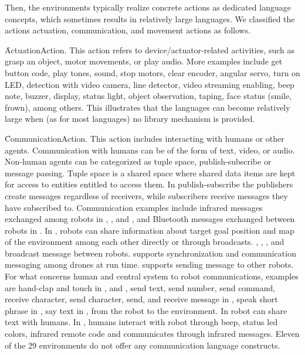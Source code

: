 Then, the environments typically realize concrete actions as dedicated language concepts, which sometimes results in relatively large languages. We classified the actions actuation, communication, and movement actions as follows.

\f{ActuationAction}. This action refers to device/actuator-related activities, such as grasp an object, motor movements, or play audio. More examples include get button code, play tones, sound, stop motors, clear encoder, angular servo, turn on LED, detection with video camera, line detector, video streaming enabling, beep note, buzzer, display, status light, object observation, taping, face status (smile, frown), among others. This illustrates that the languages can become relatively large when (as for most languages) no library mechanism is provided. %

\f{CommunicationAction}. This action includes interacting with humans or other agents. Communication with humans can be of the form of text, video, or audio. Non-human agents can be categorized as tuple space, publish-subscribe or message passing. Tuple space is a shared space where shared data items are kept for access to entities entitled to access them. In publish-subscribe the publishers create messages regardless of receivers, while subscribers receive messages they have subscribed to.
%
Communication examples include infrared messages exchanged among robots in \edison, \lego, and \openroberta, and Bluetooth messages exchanged between robots in \lego. In \missionlab, robots can share information about target goal position and map of the environment among each other directly or through broadcasts. \sphero, \vex, \makeblock, and \tello broadcast message between robots. \flyaq supports synchronization and communication messaging among drones at run time.  \trik supports sending message to other robots. For what concerns human and central system to robot communications, examples are hand-clap and touch in \aseba, and \enchanting, send text, send number, send command, receive character, send character, send, and receive message in \tello, speak short phrase in \codelab, say text in \trik, \tivipe from the robot to the environment. In \choregraphe robot can share text with humans. In \arcbotics, humans interact with robot through beep, status led colors, infrared remote code and \picaxe communicates through infrared messages. Eleven of the 29 environments do not offer any communication language constructs.
	
